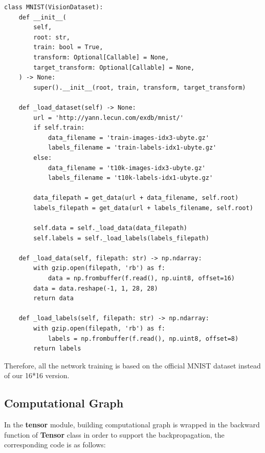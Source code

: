 \documentclass[a4paper, 11pt]{article} %
\begin{document}
\begin{lstlisting}
class MNIST(VisionDataset):
    def __init__(
        self,
        root: str,
        train: bool = True,
        transform: Optional[Callable] = None,
        target_transform: Optional[Callable] = None,
    ) -> None:
        super().__init__(root, train, transform, target_transform)

    def _load_dataset(self) -> None:
        url = 'http://yann.lecun.com/exdb/mnist/'
        if self.train:
            data_filename = 'train-images-idx3-ubyte.gz'
            labels_filename = 'train-labels-idx1-ubyte.gz'
        else:
            data_filename = 't10k-images-idx3-ubyte.gz'
            labels_filename = 't10k-labels-idx1-ubyte.gz'

        data_filepath = get_data(url + data_filename, self.root)
        labels_filepath = get_data(url + labels_filename, self.root)

        self.data = self._load_data(data_filepath)
        self.labels = self._load_labels(labels_filepath)

    def _load_data(self, filepath: str) -> np.ndarray:
        with gzip.open(filepath, 'rb') as f:
            data = np.frombuffer(f.read(), np.uint8, offset=16)
        data = data.reshape(-1, 1, 28, 28)
        return data

    def _load_labels(self, filepath: str) -> np.ndarray:
        with gzip.open(filepath, 'rb') as f:
            labels = np.frombuffer(f.read(), np.uint8, offset=8)
        return labels
\end{lstlisting}

Therefore, all the network training is based on the official MNIST dataset instead of our
16*16 version.

\subsection{\textbf{Computational Graph}}

In the \textbf{tensor} module, building computational graph is wrapped in the backward
function of \textbf{Tensor} class in order to support the backpropagation, the corresponding
code is as follows:
\end{document}
